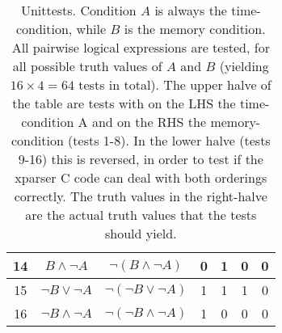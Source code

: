 \documentclass[11pt,a4paper]{article}
\begin{document}
\begin{table}[Hb!]
\begin{tabular}{|c|c|c||cccc|}
\hline 
14 & $B \land \neg A$ & $\neg(B \land \neg A)$ & 0 & 1 & 0 & 0\\  
\hline 
15 & $\neg B \lor \neg A$ & $\neg(\neg B \lor \neg A)$ & 1 & 1 & 1 & 0\\  
\hline 
16 & $\neg B \land \neg A$ & $\neg(\neg B \land \neg A)$ & 1 & 0 & 0 & 0\\  
\hline 
\end{tabular}
\caption{Unittests. Condition $A$ is always the time-condition, while $B$ is the memory condition. All pairwise logical expressions are tested, for all possible truth values of $A$ and $B$ (yielding $16\times 4=64$ tests in total). The upper halve of the table are tests with on the LHS the time-condition A and on the RHS the memory-condition (tests 1-8). In the lower halve (tests 9-16) this is reversed, in order to test if the xparser C code can deal with both orderings correctly. The truth values in the right-halve are the actual truth values that the tests should yield.}
\end{table}
\end{document}
